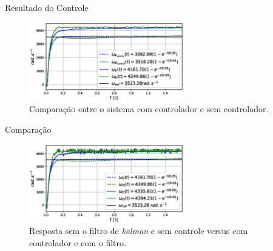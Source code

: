 \begin{frame}{Resultado do Controle}

    \begin{figure}
        \centering
        \includegraphics[width=0.6\textwidth]{figuras/resultados/exp03/controlador_vs_sem_controlador100.eps}
        \caption{Comparação entre o sistema com controlador e sem controlador.}
    \end{figure}
    
\end{frame}

\begin{frame}{Comparação}
    \begin{figure}
        \centering
        \includegraphics[width=0.6\textwidth]{figuras/resultados/exp03/antes_vs_depois100.eps}
        \caption{Resposta sem o filtro de \emph{kalman} e sem controle versus com controlador e com o filtro.}
    \end{figure}
\end{frame}